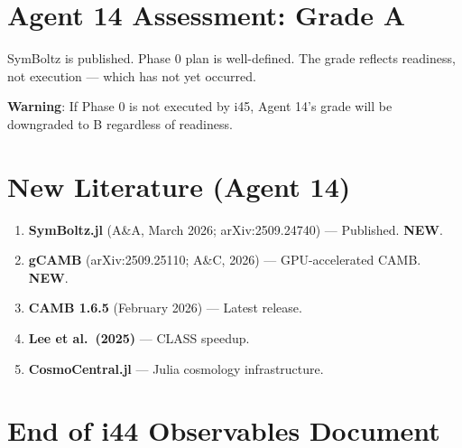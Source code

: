 \documentclass[11pt,a4paper]{article}
\newcommand{\NEW}{\textcolor{dfdblue}{\textbf{NEW}}}
\begin{document}
\section{Agent 14 Assessment: Grade A}

SymBoltz is published. Phase 0 plan is well-defined. The grade reflects readiness, not execution --- which has not yet occurred.

\textbf{Warning}: If Phase 0 is not executed by i45, Agent 14's grade will be downgraded to B regardless of readiness.

\section{New Literature (Agent 14)}

\begin{enumerate}
\item \textbf{SymBoltz.jl} (A\&A, March 2026; arXiv:2509.24740) --- Published. \NEW.
\item \textbf{gCAMB} (arXiv:2509.25110; A\&C, 2026) --- GPU-accelerated CAMB. \NEW.
\item \textbf{CAMB 1.6.5} (February 2026) --- Latest release.
\item \textbf{Lee et al.\ (2025)} --- CLASS speedup.
\item \textbf{CosmoCentral.jl} --- Julia cosmology infrastructure.
\end{enumerate}


\section*{End of i44 Observables Document}
\end{document}
